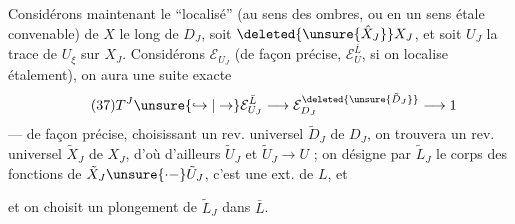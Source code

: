 Considérons maintenant le ``localisé''  (au sens des ombres, ou en un sens étale convenable) de $X$ le long de $D_J$, soit $\deleted{\unsure{\hat X_J}}X_J$, et soit $U_J$  la trace de $U_\xi$ sur $X_J$. Considérons $\mathcal E_{U_J}$ (de façon précise, $\mathcal E_U^{\bar L}$, si on localise  étalement), on aura une suite exacte
\[
\tag{37}
T^J\unsure{\hookrightarrow|\to}\mathcal E_{U_J}^{\bar L}\longrightarrow\mathcal E_{D_J}^{\deleted{\unsure{\tilde D_J}}}\longrightarrow1
\]
--- de façon précise, choisissant un rev. universel $\tilde D_J$ de $D_J$, on trouvera un rev. universel  $\tilde X_J$ de $X_J$, d'où d'ailleurs $\tilde U_J$ et $\tilde U_J\longrightarrow U$ ;  on désigne par $\tilde L_J$ le corps des fonctions de $\tilde X_J\unsure{\mathrel{\cdot-}}\tilde U_J$, c'est une ext.  de $L$, et






et on choisit un plongement de $\tilde L_J$ dans $\bar L$.

